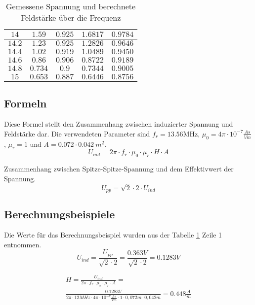 \documentclass[12pt,a4paper,ngerman]{article}
\begin{document}
\begin{table}[H]
\begin{center}
\begin{tabular}{ |c|c|c|c|c| }
      \hline
  $14$ & $1.59$ & $0.925$ & $1.6817$ & $0.9784$ \\
      \hline
  $14.2$ & $1.23$ & $0.925$ & $1.2826$ & $0.9646$ \\
      \hline
  $14.4$ & $1.02$ & $0.919$ & $1.0489$ & $0.9450$ \\
      \hline
  $14.6$ & $0.86$ & $0.906$ & $0.8722$ & $0.9189$ \\
      \hline
  $14.8$ & $0.734$ & $0.9$ & $0.7344$ & $0.9005$ \\
      \hline
  $15$ & $0.653$ & $0.887$ & $0.6446$ & $0.8756$ \\
      \hline
\end{tabular}
\caption{Gemessene Spannung und berechnete Feldstärke über die Frequenz}
\label{tab:2}
\end{center}
\end{table}
\subsection{Formeln}
Diese Formel stellt den Zusammenhang zwischen induzierter Spannung und Feldstärke dar. Die verwendeten Parameter sind $f_r = 13.56$MHz, $\mu_0 = 4\pi \cdot 10^{-7}\frac{As}{Vm}$, $\mu_r = 1$ und $A = 0.072 \cdot 0.042\ m^2$.
\begin{equation}
U_{ind} = 2\pi \cdot f_r \cdot \mu_0 \cdot \mu_r \cdot H \cdot A
\end{equation}

Zusammenhang zwischen Spitze-Spitze-Spannung und dem Effektivwert der Spannung.
\begin{equation}
U_{pp} = \sqrt{2}  \cdot 2 \cdot U_{ind}
\end{equation}
\pagebreak
\subsection{Berechnungsbeispiele}
Die Werte für das Berechnungsbeispiel wurden aus der Tabelle \ref{tab:2} Zeile 1 entnommen.
\begin{equation}
U_{ind} = \frac{U_{pp}}{\sqrt{2}  \cdot 2} = \frac{0.363V}{\sqrt{2}  \cdot 2} = 0.1283 V
\end{equation}

\begin{gather}
H = \frac{U_{ind}}{2\pi \cdot f_r \cdot \mu_e \cdot \mu_r \cdot A} = \\
\frac{0.1283V}{2\pi \cdot 12MHz \cdot 4\pi \cdot 10^{-7}\frac{As}{Vm} \cdot 1 \cdot 0,072m \cdot 0,042m} = 0.448\frac{A}{m}
\end{gather}
\end{document}
